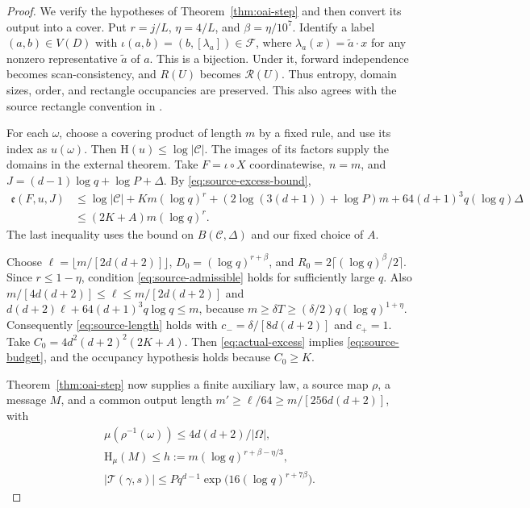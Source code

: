 \documentclass[11pt,a4paper]{article}
\numberwithin{equation}{section}
\newcommand{\HH}{\mathrm H}
\newcommand{\cC}{\mathcal C}
\newcommand{\src}[1]{\texttt{\detokenize{#1}}}
\newcommand{\oairoot}{https://github.com/openai/math/blob/adc7f1241b42e322a6451854ab7e4b4c146bf78a/lean/OAI/Combinatorics/SharpRamsey/}
\newcommand{\source}[2]{\href{\oairoot#1}{\src{#2}}}
\begin{document}
\begin{proof}
We verify the hypotheses of Theorem~\ref{thm:oai-step} and then
convert its output into a cover.
Put $r=j/L$, $\eta=4/L$, and $\beta=\eta/10^7$.
Identify a label $(a,b)\in V(D)$ with
$\iota(a,b)=(b,[\lambda_a])\in\mathcal F$, where
$\lambda_a(x)=\widetilde a\cdot x$ for any nonzero
representative $\widetilde a$ of $a$.
This is a bijection. Under it, forward independence becomes
scan-consistency, and $R(U)$ becomes $\mathcal R(U)$.
Thus entropy, domain sizes, order, and rectangle occupancies are
preserved. This also agrees with the source rectangle convention
in \source{Construction/InitialTools.lean}{rectangle_pair_iff}.

For each $\omega$, choose a covering product of length $m$
by a fixed rule, and use its index as $u(\omega)$.
Then $\HH(u)\le\log|\cC|$.
The images of its factors supply the domains in the external
theorem. Take $F=\iota\circ X$ coordinatewise,
$n=m$, and $J=(d-1)\log q+\log P+\Delta$.
By \eqref{eq:source-excess-bound},
\begin{equation}\label{eq:actual-excess}
 \begin{aligned}
 \mathfrak e(F,u,J)
 &\le\log|\cC|+Km(\log q)^r
      +(2\log(3(d+1))+\log P)m+64(d+1)^3q(\log q)\Delta\\
 &\le(2K+A)m(\log q)^r.
 \end{aligned}
\end{equation}
The last inequality uses the bound on $B(\cC,\Delta)$ and our
fixed choice of $A$.

Choose $\ell=\lfloor m/[2d(d+2)]\rfloor$,
$D_0=(\log q)^{r+\beta}$, and
$R_0=2\lceil(\log q)^\beta/2\rceil$.
Since $r\le1-\eta$, condition \eqref{eq:source-admissible}
holds for sufficiently large $q$.
Also $m/[4d(d+2)]\le\ell\le m/[2d(d+2)]$ and
$d(d+2)\ell+64(d+1)^3q\log q\le m$, because
$m\ge\delta T\ge(\delta/2)q(\log q)^{1+\eta}$.
Consequently \eqref{eq:source-length} holds with
$c_-=\delta/[8d(d+2)]$ and $c_+=1$.
Take $C_0=4d^2(d+2)^2(2K+A)$.
Then \eqref{eq:actual-excess} implies
\eqref{eq:source-budget}, and the occupancy hypothesis holds
because $C_0\ge K$.

Theorem~\ref{thm:oai-step} now supplies a finite auxiliary law,
a source map $\rho$, a message $M$, and a common output length
$m'\ge\ell/64\ge m/[256d(d+2)]$, with
\begin{equation}\label{eq:raw}
 \begin{gathered}
 \mu(\rho^{-1}(\omega))\le4d(d+2)/|\Omega|,\\
 \HH_\mu(M)\le h:=m(\log q)^{r+\beta-\eta/3},\\
 |\mathcal T(\gamma,s)|\le Pq^{d-1}
             \exp\bigl(16(\log q)^{r+7\beta}\bigr).
 \end{gathered}
\end{equation}


\end{proof}
\end{document}
